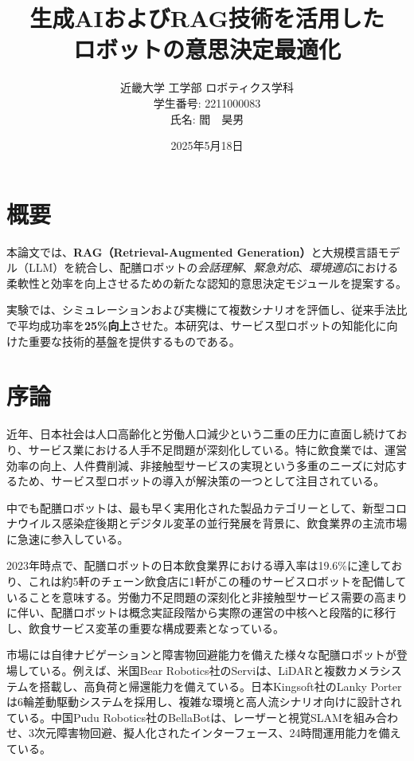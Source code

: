 \documentclass[12pt]{report}
\title{\LARGE 生成AIおよびRAG技術を活用した\\ロボットの意思決定最適化}
\author{近畿大学 工学部 ロボティクス学科\\[10pt]
学生番号: 2211000083\\[5pt]
氏名: 閻　昊男}
\date{2025年5月18日}
\begin{document}
\maketitle
\thispagestyle{empty}
\newpage

\setcounter{page}{1}

\chapter*{概要}

本論文では、\textbf{RAG（Retrieval-Augmented Generation）}と大規模言語モデル（LLM）を統合し、配膳ロボットの\textit{会話理解}、\textit{緊急対応}、\textit{環境適応}における柔軟性と効率を向上させるための新たな認知的意思決定モジュールを提案する。

実験では、シミュレーションおよび実機にて複数シナリオを評価し、従来手法比で平均成功率を\textbf{25\%向上}させた。本研究は、サービス型ロボットの知能化に向けた重要な技術的基盤を提供するものである。

\newpage

\tableofcontents
\newpage

\setcounter{page}{1}

\chapter{序論}
\label{chap:intro}

近年、日本社会は人口高齢化と労働人口減少という二重の圧力に直面し続けており、サービス業における人手不足問題が深刻化している。特に飲食業では、運営効率の向上、人件費削減、非接触型サービスの実現という多重のニーズに対応するため、サービス型ロボットの導入が解決策の一つとして注目されている。

中でも配膳ロボットは、最も早く実用化された製品カテゴリーとして、新型コロナウイルス感染症後期とデジタル変革の並行発展を背景に、飲食業界の主流市場に急速に参入している。

2023年時点で、配膳ロボットの日本飲食業界における導入率は19.6\%に達しており、これは約5軒のチェーン飲食店に1軒がこの種のサービスロボットを配備していることを意味する。労働力不足問題の深刻化と非接触型サービス需要の高まりに伴い、配膳ロボットは概念実証段階から実際の運営の中核へと段階的に移行し、飲食サービス変革の重要な構成要素となっている。

市場には自律ナビゲーションと障害物回避能力を備えた様々な配膳ロボットが登場している。例えば、米国Bear Robotics社のServiは、LiDARと複数カメラシステムを搭載し、高負荷と帰還能力を備えている。日本Kingsoft社のLanky Porterは6輪差動駆動システムを採用し、複雑な環境と高人流シナリオ向けに設計されている。中国Pudu Robotics社のBellaBotは、レーザーと視覚SLAMを組み合わせ、3次元障害物回避、擬人化されたインターフェース、24時間運用能力を備えている。
\end{document}
